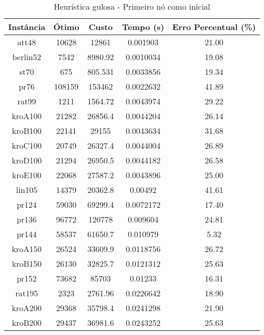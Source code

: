 \documentclass[10pt]{extarticle} %
\begin{document}
\begin{table}[H]
    \centering
    \begin{tabular}{|c|c|c|c|c|} \hline 
         \textbf{Instância} & \textbf{Ótimo} & \textbf{Custo} & \textbf{Tempo (s)} & \textbf{Erro Percentual (\%)} \\ \hline 
         att48       & 10628     & 12861    & 0.001903  & 21.00 \\ \hline
         berlin52    & 7542      & 8980.92  & 0.0010034 & 19.08 \\ \hline 
         st70        & 675       & 805.531  & 0.0033856 & 19.34 \\ \hline 
         pr76        & 108159    & 153462   & 0.0022632 & 41.89 \\ \hline 
         rat99       & 1211      & 1564.72  & 0.0043974 & 29.22 \\ \hline 
         kroA100     & 21282     & 26856.4  & 0.0044204 & 26.14 \\ \hline 
         kroB100     & 22141     & 29155    & 0.0043634 & 31.68 \\ \hline 
         kroC100     & 20749     & 26327.4  & 0.0044004 & 26.89 \\ \hline 
         kroD100     & 21294     & 26950.5  & 0.0044182 & 26.58 \\ \hline 
         kroE100     & 22068     & 27587.2  & 0.0043896 & 25.00 \\ \hline 
         lin105      & 14379     & 20362.8  & 0.00492   & 41.61 \\ \hline 
         pr124       & 59030     & 69299.4  & 0.0072172 & 17.40 \\ \hline 
         pr136       & 96772     & 120778   & 0.009604  & 24.81 \\ \hline 
         pr144       & 58537     & 61650.7  & 0.010979  & 5.32  \\ \hline 
         kroA150     & 26524     & 33609.9  & 0.0118756 & 26.72 \\ \hline 
         kroB150     & 26130     & 32825.7  & 0.0121312 & 25.63 \\ \hline 
         pr152       & 73682     & 85703    & 0.01233   & 16.31 \\ \hline          
         rat195      & 2323      & 2761.96  & 0.0226642 & 18.90 \\ \hline            
         kroA200     & 29368     & 35798.4  & 0.0241298 & 21.90 \\ \hline         
         kroB200     & 29437     & 36981.6  & 0.0243252 & 25.63 \\ \hline 
    \end{tabular}
    \caption{Heurística gulosa - Primeiro nó como inicial}
    \label{tab:my_label}
\end{table}
\end{document}
